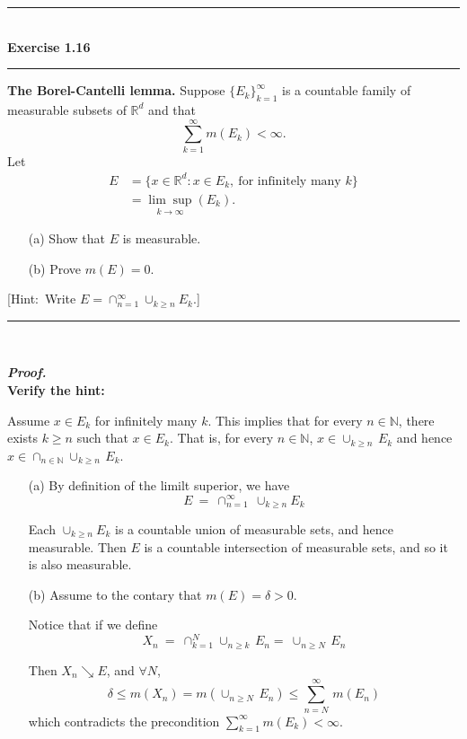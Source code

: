 \documentclass[a4paper,11pt]{article}
\begin{document}

\begin{flushleft}
	\rule[-0.5ex]{17cm}{2pt}\\
		\textbf{Exercise 1.16}\\
	\rule[1.5ex]{17cm}{0.5pt}
		\textbf{The Borel-Cantelli lemma.} Suppose $\{E_k\}_{k = 1}^\infty$ is a countable family of measurable subsets of $\mathbb{R}^d$ and that
			$$\sum_{k=1}^\infty m(E_k) < \infty.$$
		Let
			$$\begin{aligned}
			E
			&= \{x \in \mathbb{R}^d : x \in E_k,\ \text{for infinitely many }k\}\\
			&= \underset{k \to \infty}{\lim \sup} (E_k).
			\end{aligned}$$
		\begin{enumerate}
			\item [(a)] Show that $E$ is measurable.

			\item [(b)] Prove $m(E) = 0$.
		\end{enumerate}
		[Hint:\ Write $E = \cap_{n = 1}^\infty \cup_{k \geq n} E_k$.]
	\rule[1.0ex]{17cm}{0.5pt}\
\end{flushleft}

\textbf{\textit{Proof.}}\\

\textbf{Verify the hint:}

Assume $x \in E_k$ for infinitely many $k$. This implies that for every $n \in \mathbb{N}$, there exists $k \geq n$ such that $x \in E_k$. That is, for every $n \in \mathbb{N}$, $x \in \cup_{k \geq n}\,E_k$ and hence $x \in \cap_{n \in \mathbb{N}} \cup_{k \geq n}\,E_k$.

\begin{enumerate}
	\item [(a)] By definition of the limilt superior, we have
		$$E\ =\ \cap_{n = 1}^{\infty}\ \cup_{k \geq n} E_k$$

	Each $\cup_{k \geq n} E_k$ is a countable union of measurable sets, and hence measurable. Then $E$ is a countable intersection of measurable sets, and so it is also measurable.\\

	\item [(b)] Assume to the contary that $m(E) = \delta > 0$.

	Notice that if we define
		$$X_n\
		=\ \cap_{k=1}^N \cup_{n \geq k}\, E_n
		=\ \cup_{n \geq N}\, E_n$$

	Then $X_n \searrow E$, and $\forall N$,
		$$\delta
		\leq m(X_n)
		= m\left( \cup_{n \geq N}\, E_n\right)
		\leq \sum_{n = N}^\infty\, m(E_n)$$
	which contradicts the precondition $\sum_{k=1}^\infty m(E_k) < \infty$.\\\\
\end{enumerate}
\end{document}
